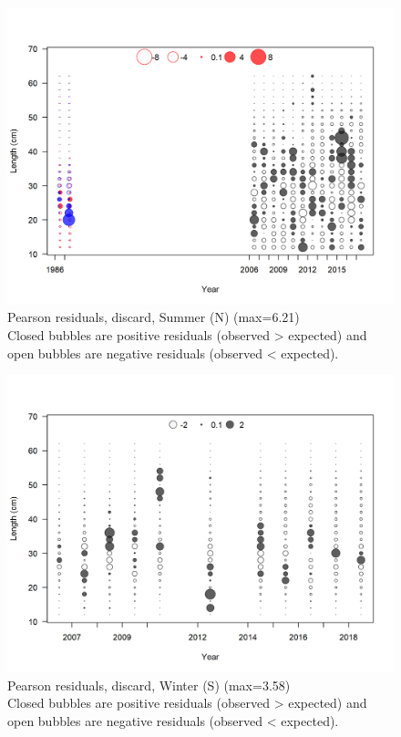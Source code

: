\documentclass[12pt,]{article}
\begin{document}
\begin{figure}
\centering
\includegraphics{r4ss/plots_mod1/comp_lenfit_residsflt2mkt1.png}
\caption{Pearson residuals, discard, Summer (N) (max=6.21)\\
Closed bubbles are positive residuals (observed \textgreater{} expected)
and open bubbles are negative residuals (observed \textless{} expected).
\label{fig:discard_sn_len_pearson}}
\end{figure}

\begin{figure}
\centering
\includegraphics{r4ss/plots_mod1/comp_lenfit_residsflt3mkt1.png}
\caption{Pearson residuals, discard, Winter (S) (max=3.58)\\
Closed bubbles are positive residuals (observed \textgreater{} expected)
and open bubbles are negative residuals (observed \textless{} expected).
\label{fig:discard_ws_len_pearson}}
\end{figure}
\end{document}
